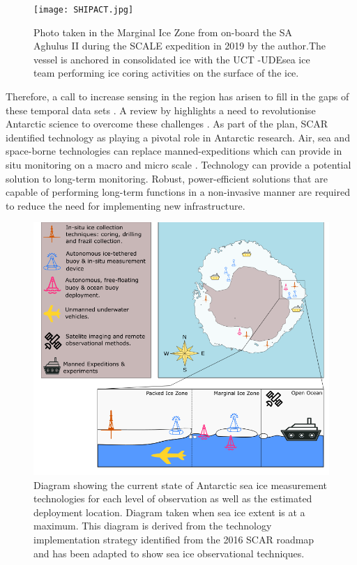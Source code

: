 \begin{figure}[H]
    \centering
    \texttt{[image: SHIPACT.jpg]}
    \caption{Photo taken in the Marginal Ice Zone from on-board the SA Aghulus II during the SCALE expedition in 2019 by the author.The vessel is anchored in consolidated ice with the UCT \protect\footnotemark -UDE\protect\footnotemark sea ice team performing ice coring activities on the surface of the ice.}
    \label{fig:cruise}
\end{figure}

Therefore, a call to increase sensing in the region has arisen to fill in the gaps of these temporal data sets \cite{kennicutt2019sustained}. A review by \textcite{kennicutt2016delivering} highlights a need to revolutionise Antarctic science to overcome these challenges \cite{kennicutt2016delivering}. As part of the plan, SCAR identified technology as playing a pivotal role in Antarctic research. Air, sea and space-borne technologies can replace manned-expeditions which can provide in situ monitoring on a macro and micro scale \cite{kennicutt2016delivering}. Technology can provide a potential solution to long-term monitoring. Robust, power-efficient solutions that are capable of performing long-term functions in a non-invasive manner are required to reduce the need for implementing new infrastructure.\par

\begin{figure}[H]
    \centering
    \includegraphics[scale=0.5]{tech.png}
    \caption{ Diagram showing the current state of Antarctic sea ice measurement technologies for each level of observation as well as the estimated deployment location. Diagram taken when sea ice extent is at a maximum. This diagram is derived from the technology implementation strategy identified from the 2016 SCAR roadmap \cite{kennicutt2019sustained}\protect\footnotemark and has been adapted to show sea ice observational techniques. }
    \label{fig:chapter1_tech_diag}
\end{figure}

